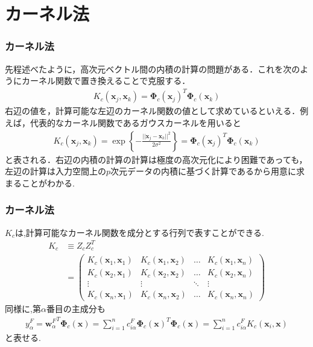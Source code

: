 \documentclass[dvipdfmx,cjk]{beamer}
\theoremstyle{example}
\begin{document}
\section{カーネル法}
\begin{frame}
    \frametitle{カーネル法}
    先程述べたように，高次元ベクトル間の内積の計算の問題がある．これを次のようにカーネル関数で置き換えることで克服する．
    \begin{align*}
        K_c(\boldsymbol{x}_j,\boldsymbol{x}_k)={\boldsymbol{\Phi}_c(\boldsymbol{x}_j)}^T\boldsymbol{\Phi}_c(\boldsymbol{x}_k)
    \end{align*}
    右辺の値を，計算可能な左辺のカーネル関数の値として求めているといえる．例えば，代表的なカーネル関数であるガウスカーネルを用いると
    \begin{align*}
        K_c(\boldsymbol{x}_j,\boldsymbol{x}_k)=\exp\left\{-\frac{{||\boldsymbol{x}_j-\boldsymbol{x}_k||}^2}{2\sigma^2}\right\}={\boldsymbol{\Phi}_c(\boldsymbol{x}_j)}^T\boldsymbol{\Phi}_c(\boldsymbol{x}_k)\tag{4}
    \end{align*}
    と表される．右辺の内積の計算の計算は極度の高次元化により困難であっても，左辺の計算は入力空間上の$p$次元データの内積に基づく計算であるから用意に求まることがわかる.
\end{frame}
\begin{frame}
    \frametitle{カーネル法}
    $K_c$は,計算可能なカーネル関数を成分とする行列で表すことができる.
    \begin{align*}
        K_c & \equiv Z_cZ_c^T                                                                                                                    \\
            & =\begin{pmatrix}
                   K_c(\boldsymbol{x}_1,\boldsymbol{x}_1) & K_c(\boldsymbol{x}_1,\boldsymbol{x}_2) & \dots  & K_c(\boldsymbol{x}_1,\boldsymbol{x}_n) \\
                   K_c(\boldsymbol{x}_2,\boldsymbol{x}_1) & K_c(\boldsymbol{x}_2,\boldsymbol{x}_2) & \dots  & K_c(\boldsymbol{x}_2,\boldsymbol{x}_n) \\
                   \vdots                                 & \vdots                                 & \ddots & \vdots                                 \\
                   K_c(\boldsymbol{x}_n,\boldsymbol{x}_1) & K_c(\boldsymbol{x}_n,\boldsymbol{x}_2) & \dots  & K_c(\boldsymbol{x}_n,\boldsymbol{x}_n)
               \end{pmatrix}
    \end{align*}
    同様に,第$\alpha$番目の主成分も
    \begin{align*}
        y_\alpha^F={\boldsymbol{w}_\alpha^F}^T\boldsymbol{\Phi}_c(\boldsymbol{x})=\sum_{i=1}^{n}c_{i\alpha}^F{\boldsymbol{\Phi}_c(\boldsymbol{x})}^T\boldsymbol{\Phi}_c(\boldsymbol{x})=\sum_{i=1}^{n}c_{i\alpha}^FK_c(\boldsymbol{x}_i,\boldsymbol{x})
    \end{align*}
    と表せる.
\end{frame}
\end{document}
